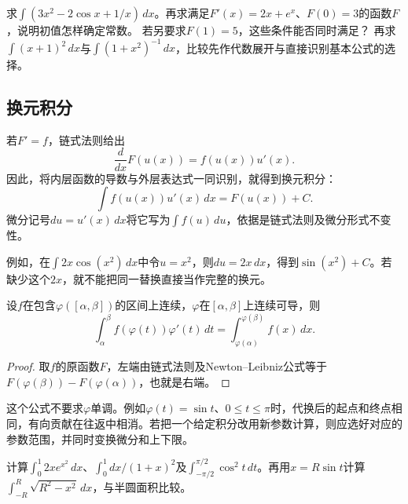 \begin{example}
求\(\int(3x^2-2\cos x+1/x)\,dx\)。再求满足\(F'(x)=2x+e^x\)、\(F(0)=3\)的函数\(F\)，说明初值怎样确定常数。
若另要求\(F(1)=5\)，这些条件能否同时满足？
再求\(\int(x+1)^2\,dx\)与\(\int(1+x^2)^{-1}\,dx\)，比较先作代数展开与直接识别基本公式的选择。
\end{example}

\subsection{换元积分}

若\(F'=f\)，链式法则给出
\begin{equation*}
 \frac d{dx}F(u(x))=f(u(x))u'(x).
\end{equation*}
因此，将内层函数的导数与外层表达式一同识别，就得到换元积分：
\begin{equation*}
 \int f(u(x))u'(x)\,dx=F(u(x))+C.
\end{equation*}
微分记号\(du=u'(x)\,dx\)将它写为\(\int f(u)\,du\)，依据是链式法则及微分形式不变性。

例如，在\(\int2x\cos(x^2)\,dx\)中令\(u=x^2\)，则\(du=2x\,dx\)，得到\(\sin(x^2)+C\)。若缺少这个\(2x\)，就不能把同一替换直接当作完整的换元。

\begin{theorem}[定积分换元公式]\label{thm:calculus-substitution}
设\(f\)在包含\(\varphi([\alpha,\beta])\)的区间上连续，\(\varphi\)在\([\alpha,\beta]\)上连续可导，则
\begin{equation}\label{eq:calculus-substitution}
 \int_\alpha^\beta f(\varphi(t))\varphi'(t)\,dt
 =\int_{\varphi(\alpha)}^{\varphi(\beta)}f(x)\,dx.
\end{equation}
\end{theorem}

\begin{proof}
取\(f\)的原函数\(F\)，左端由链式法则及Newton--Leibniz公式等于\(F(\varphi(\beta))-F(\varphi(\alpha))\)，也就是右端。
\end{proof}

这个公式不要求\(\varphi\)单调。例如\(\varphi(t)=\sin t\)、\(0\le t\le\pi\)时，代换后的起点和终点相同，有向贡献在往返中相消。若把一个给定积分改用新参数计算，则应选好对应的参数范围，并同时变换微分和上下限。

\begin{example}
计算\(\int_0^1 2x e^{x^2}\,dx\)、\(\int_0^1 dx/(1+x)^2\)及\(\int_{-\pi/2}^{\pi/2}\cos^2t\,dt\)。再用\(x=R\sin t\)计算\(\int_{-R}^R\sqrt{R^2-x^2}\,dx\)，与半圆面积比较。
\end{example}

